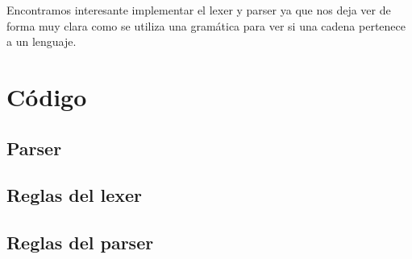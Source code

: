\documentclass{article}
\theoremstyle{definition}
\theoremstyle{remark}
\begin{document}
Encontramos interesante implementar el lexer y parser ya que nos deja ver de forma muy clara como se utiliza una gramática para ver si una cadena pertenece a un lenguaje.
\pagebreak

\section{Código}

\subsection{Parser}


\subsection{Reglas del lexer}


\subsection{Reglas del parser}

\end{document}
